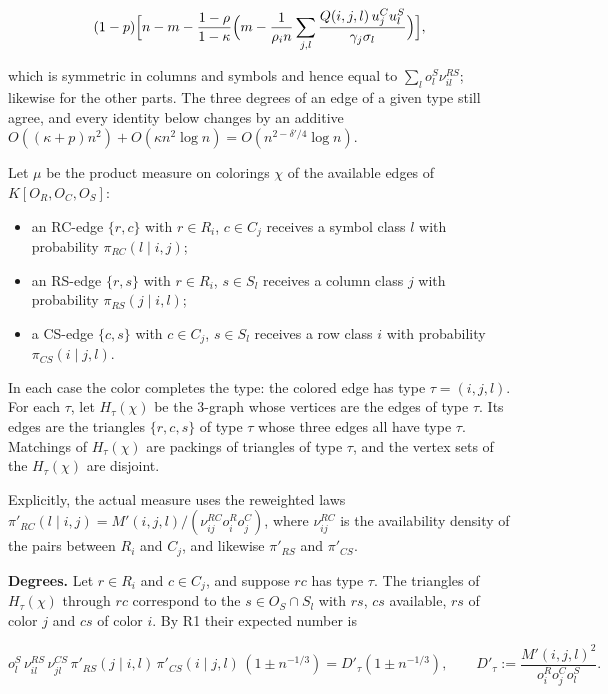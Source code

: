 \documentclass[english,11pt,a4paper]{article}
\providecommand{\tightlist}{\setlength{\itemsep}{0pt}\setlength{\parskip}{0pt}}
\begin{document}
\nopagebreak[4]
\[(1-p)\Bigl[n-m-\frac{1-\rho}{1-\kappa}\Bigl(m-\frac{1}{\rho_in}\sum_{j,l}\frac{Q(i,j,l)\,u^C_ju^S_l}{\gamma_j\sigma_l}\Bigr)\Bigr],\]

which is symmetric in columns and symbols and hence equal to \(\sum_lo^S_l\nu^{RS}_{il}\); likewise for the other parts. The three degrees of an edge of a given type still agree, and every identity below changes by an additive \(O((\kappa+p)n^2)+O(\kappa n^2\log n)=O(n^{2-\delta'/4}\log n)\).

Let \(\mu\) be the product measure on colorings \(\chi\) of the available edges of \(K[O_R,O_C,O_S]\):

\begin{itemize}
\tightlist
\item
  an RC-edge \(\{r,c\}\) with \(r\in R_i\), \(c\in C_j\) receives a symbol class \(l\) with probability \(\pi_{RC}(l\mid i,j)\);
\item
  an RS-edge \(\{r,s\}\) with \(r\in R_i\), \(s\in S_l\) receives a column class \(j\) with probability \(\pi_{RS}(j\mid i,l)\);
\item
  a CS-edge \(\{c,s\}\) with \(c\in C_j\), \(s\in S_l\) receives a row class \(i\) with probability \(\pi_{CS}(i\mid j,l)\).
\end{itemize}

In each case the color completes the type: the colored edge has type \(\tau=(i,j,l)\). For each \(\tau\), let \(H_\tau(\chi)\) be the 3-graph whose vertices are the edges of type \(\tau\). Its edges are the triangles \(\{r,c,s\}\) of type \(\tau\) whose three edges all have type \(\tau\). Matchings of \(H_\tau(\chi)\) are packings of triangles of type \(\tau\), and the vertex sets of the \(H_\tau(\chi)\) are disjoint.

Explicitly, the actual measure uses the reweighted laws \(\pi'_{RC}(l\mid i,j)=M'(i,j,l)/(\nu^{RC}_{ij}o^R_io^C_j)\), where \(\nu^{RC}_{ij}\) is the availability density of the pairs between \(R_i\) and \(C_j\), and likewise \(\pi'_{RS}\) and \(\pi'_{CS}\).

\textbf{Degrees.} Let \(r\in R_i\) and \(c\in C_j\), and suppose \(rc\) has type \(\tau\). The triangles of \(H_\tau(\chi)\) through \(rc\) correspond to the \(s\in O_S\cap S_l\) with \(rs\), \(cs\) available, \(rs\) of color \(j\) and \(cs\) of color \(i\). By R1 their expected number is

\nopagebreak[4]
\[o^S_l\,\nu^{RS}_{il}\,\nu^{CS}_{jl}\,\pi'_{RS}(j\mid i,l)\,\pi'_{CS}(i\mid j,l)\,(1\pm n^{-1/3})=D'_\tau(1\pm n^{-1/3}),\qquad
D'_\tau:=\frac{M'(i,j,l)^2}{o^R_io^C_jo^S_l}.\]
\end{document}
